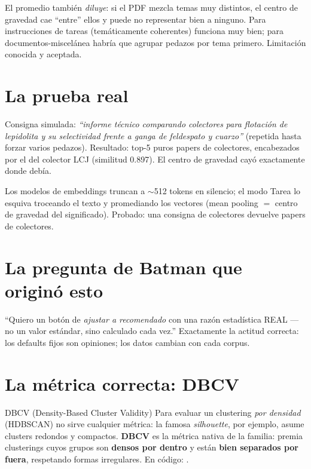 \documentclass[11pt,a4paper]{article}
\begin{document}
\begin{ojo}
El promedio también \emph{diluye}: si el PDF mezcla temas muy distintos, el centro de
gravedad cae ``entre'' ellos y puede no representar bien a ninguno. Para instrucciones de
tareas (temáticamente coherentes) funciona muy bien; para documentos-miscelánea habría que
agrupar pedazos por tema primero. Limitación conocida y aceptada.
\end{ojo}

\section{La prueba real}

Consigna simulada: \emph{``informe técnico comparando colectores para flotación de lepidolita
y su selectividad frente a ganga de feldespato y cuarzo''} (repetida hasta forzar varios
pedazos). Resultado: top-5 puros papers de colectores, encabezados por el del colector LCJ
(similitud 0.897). El centro de gravedad cayó exactamente donde debía.

\begin{resumen}
Los modelos de embeddings truncan a $\sim$512 tokens en silencio; el modo Tarea lo esquiva
troceando el texto y promediando los vectores (mean pooling $=$ centro de gravedad del
significado). Probado: una consigna de colectores devuelve papers de colectores.
\end{resumen}
\clearpage
{}
{}

\section{La pregunta de Batman que originó esto}

``Quiero un botón de \emph{ajustar a recomendado} con una razón estadística REAL — no un
valor estándar, sino calculado cada vez.'' Exactamente la actitud correcta: los defaults
fijos son opiniones; los datos cambian con cada corpus.

\section{La métrica correcta: DBCV}

\begin{concepto}{DBCV (Density-Based Cluster Validity)}
Para evaluar un clustering \emph{por densidad} (HDBSCAN) no sirve cualquier métrica: la
famosa \emph{silhouette}, por ejemplo, asume clusters redondos y compactos. \textbf{DBCV}
es la métrica nativa de la familia: premia clusterings cuyos grupos son \textbf{densos por
dentro} y están \textbf{bien separados por fuera}, respetando formas irregulares.
En código: .
\end{concepto}
\end{document}

